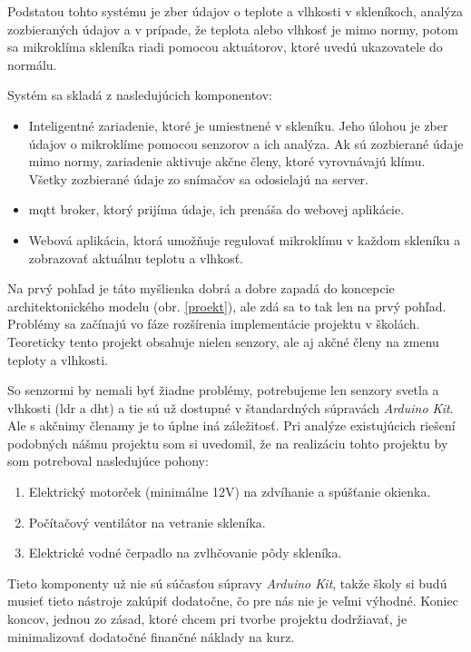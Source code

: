 Podstatou tohto systému je zber údajov o teplote a vlhkosti v skleníkoch, analýza zozbieraných údajov a v prípade, že teplota alebo vlhkosť je mimo normy, potom sa mikroklíma skleníka riadi pomocou aktuátorov, ktoré uvedú ukazovatele do normálu.

Systém sa skladá z nasledujúcich komponentov:
\begin{itemize}
    \item Inteligentné zariadenie, ktoré je umiestnené v skleníku. Jeho úlohou je zber údajov o mikroklíme pomocou senzorov a ich analýza. Ak sú zozbierané údaje mimo normy, zariadenie aktivuje akčne členy, ktoré vyrovnávajú klímu. Všetky zozbierané údaje zo snímačov sa odosielajú na server.
    \item \gls{mqtt} broker, ktorý prijíma údaje, ich prenáša do webovej aplikácie.
    \item Webová aplikácia, ktorá umožňuje regulovať mikroklímu v každom skleníku a zobrazovať aktuálnu teplotu a vlhkosť.
\end{itemize}
Na prvý pohľad je táto myšlienka dobrá a dobre zapadá do koncepcie architektonického modelu (obr. \ref{proekt}), ale zdá sa to tak len na prvý pohľad. Problémy sa začínajú vo fáze rozšírenia implementácie projektu v školách. Teoreticky tento projekt obsahuje nielen senzory, ale aj akčné členy na zmenu teploty a vlhkosti. 

So senzormi by nemali byť žiadne problémy, potrebujeme len senzory svetla a vlhkosti (\gls{ldr} a \gls{dht}) a tie sú už dostupné v štandardných súpravách \textit{Arduino Kit}. Ale s akčnimy členamy je to úplne iná záležitosť. Pri analýze existujúcich riešení podobných nášmu projektu\cite{sklenik1} \cite{sklenik2} \cite{sklenik3}som si uvedomil, že na realizáciu tohto projektu by som potreboval nasledujúce pohony:
\begin{enumerate}
    \item Elektrický motorček (minimálne 12V) na zdvíhanie a spúšťanie okienka.
    \item Počítačový ventilátor na vetranie skleníka.
    \item Elektrické vodné čerpadlo na zvlhčovanie pôdy skleníka.
\end{enumerate}
Tieto komponenty už nie sú súčasťou súpravy \textit{Arduino Kit}, takže školy si budú musieť tieto nástroje zakúpiť dodatočne, čo pre nás nie je veľmi výhodné. Koniec koncov, jednou zo zásad, ktoré chcem pri tvorbe projektu dodržiavať, je minimalizovať dodatočné finančné náklady na kurz. 

